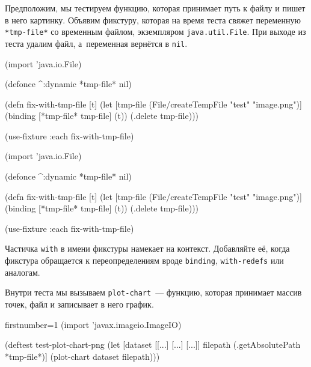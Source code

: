 Предположим, мы тестируем функцию, которая принимает путь к файлу и пишет в него
картинку. Объявим фикстуру, которая на время теста свяжет переменную
\verb|*tmp-file*| со временным файлом, экземпляром \verb|java.util.File|. При
выходе из теста удалим файл, а~переменная вернётся в \verb|nil|.

\pagebreakafive


\ifnarrow

\begin{english}
  \begin{clojure}
(import 'java.io.File)

(defonce ^:dynamic *tmp-file* nil)

(defn fix-with-tmp-file [t]
  (let [tmp-file
        (File/createTempFile
          "test" "image.png")]
    (binding [*tmp-file* tmp-file]
      (t))
    (.delete tmp-file)))

(use-fixture :each fix-with-tmp-file)
  \end{clojure}
\end{english}

\else

\begin{english}
  \begin{clojure}
(import 'java.io.File)

(defonce ^:dynamic *tmp-file* nil)

(defn fix-with-tmp-file [t]
  (let [tmp-file (File/createTempFile "test" "image.png")]
    (binding [*tmp-file* tmp-file]
      (t))
    (.delete tmp-file)))

(use-fixture :each fix-with-tmp-file)
  \end{clojure}
\end{english}

\fi

Частичка \verb|with| в имени фикстуры намекает на контекст. Добавляйте её, когда
фикстура обращается к переопределениям вроде \verb|binding|, \verb|with-redefs|
или аналогам.


Внутри теста мы вызываем \verb|plot-chart|~--- функцию, которая принимает массив
точек, файл и записывает в него график.

\ifnarrow

\begin{english}
  \begin{clojure/lines*}{firstnumber=1}
(import 'javax.imageio.ImageIO)

(deftest test-plot-chart-png
 (let [dataset [[...] [...] [...]]
       filepath (.getAbsolutePath
                          *tmp-file*)]
   (plot-chart dataset filepath)))
  \end{clojure/lines*}
\end{english}

